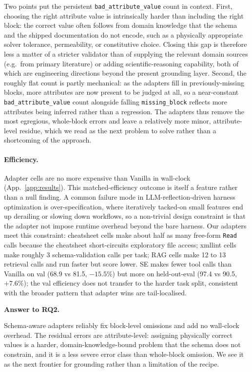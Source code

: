 \documentclass{article}
\newif\ifrqfancy
\newenvironment{rqanswer}[1]{%
  \ifrqfancy\begin{rqbox}\fi\noindent\textbf{Answer to #1.}\ %
}{%
  \ifrqfancy\end{rqbox}\else\par\smallskip\fi%
}
\begin{document}
Two points put the persistent \texttt{bad\_attribute\_value} count in context. First, choosing the right attribute value is intrinsically harder than including the right block: the correct value often follows from domain knowledge that the schema and the shipped documentation do not encode, such as a physically appropriate solver tolerance, permeability, or constitutive choice. Closing this gap is therefore less a matter of a stricter validator than of supplying the relevant domain sources (e.g.\ from primary literature) or adding scientific-reasoning capability, both of which are engineering directions beyond the present grounding layer. Second, the roughly flat count is partly mechanical: as the adapters fill in previously-missing blocks, more attributes are now present to be judged at all, so a near-constant \texttt{bad\_attribute\_value} count alongside falling \texttt{missing\_block} reflects more attributes being inferred rather than a regression. The adapters thus remove the most egregious, whole-block errors and leave a relatively more minor, attribute-level residue, which we read as the next problem to solve rather than a shortcoming of the approach.

\paragraph{Efficiency.}\label{subsec:efficiency} Adapter cells are no more expensive than Vanilla in wall-clock (App.~\ref{app:results}). This matched-efficiency outcome is itself a feature rather than a null finding. A common failure mode in LLM-reflection-driven harness optimization is over-specification, where iteratively tacked-on small features end up derailing or slowing down workflows, so a non-trivial design constraint is that the adapter not impose runtime overhead beyond the bare harness. Our adapters meet this constraint: cheatsheet cells make about half as many free-form \texttt{Read} calls because the cheatsheet short-circuits exploratory file access; xmllint cells make roughly 3 schema-validation calls per task; RAG cells make 12 to 13 retrieval calls and run faster but score lower. SE makes fewer tool calls than Vanilla on val (68.9 vs 81.5, ${-}15.5\%$) but more on held-out-eval (97.4 vs 90.5, $+7.6\%$); the val efficiency does not transfer to the harder task split, consistent with the broader pattern that adapter wins are tail-localised.

\begin{rqanswer}{RQ2}
Schema-aware adapters reliably fix block-level omissions and add no wall-clock overhead. The residual errors are attribute-level: assigning physically correct values is a harder, domain-knowledge-bound problem that the schema does not constrain, and it is a less severe error class than whole-block omission. We see it as the next frontier for grounding rather than a limitation of the recipe.
\end{rqanswer}
\end{document}
